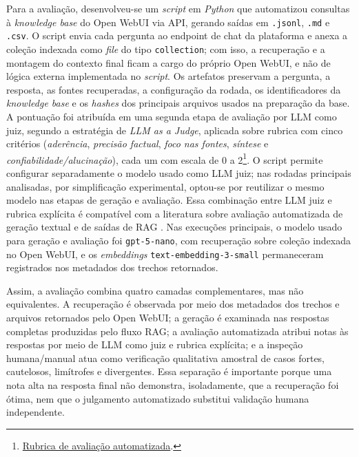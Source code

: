 Para a avaliação, desenvolveu-se um \textit{script} em \textit{Python} que automatizou consultas à \textit{knowledge base} do Open WebUI via API, gerando saídas em \texttt{.jsonl}, \texttt{.md} e \texttt{.csv}. O script envia cada pergunta ao endpoint de chat da plataforma e anexa a coleção indexada como \textit{file} do tipo \texttt{collection}; com isso, a recuperação e a montagem do contexto final ficam a cargo do próprio Open WebUI, e não de lógica externa implementada no \textit{script}. Os artefatos preservam a pergunta, a resposta, as fontes recuperadas, a configuração da rodada, os identificadores da \textit{knowledge base} e os \textit{hashes} dos principais arquivos usados na preparação da base. A pontuação foi atribuída em uma segunda etapa de avaliação por LLM como juiz, segundo a estratégia de \textit{LLM as a Judge}, aplicada sobre rubrica com cinco critérios (\textit{aderência}, \textit{precisão factual}, \textit{foco nas fontes}, \textit{síntese} e \textit{confiabilidade/alucinação}), cada um com escala de 0 a 2\footnote{\href{https://github.com/fabriciosantana/mcdia/blob/main/05-iag/4-project/eval/RUBRIC.md}{Rubrica de avaliação automatizada}.}. O script permite configurar separadamente o modelo usado como LLM juiz; nas rodadas principais analisadas, por simplificação experimental, optou-se por reutilizar o mesmo modelo nas etapas de geração e avaliação. Essa combinação entre LLM juiz e rubrica explícita é compatível com a literatura sobre avaliação automatizada de geração textual e de saídas de RAG \parencite{liuEtAl2025judgeRag,liuEtAl2023geval}. Nas execuções principais, o modelo usado para geração e avaliação foi \texttt{gpt-5-nano}, com recuperação sobre coleção indexada no Open WebUI, e os \textit{embeddings} \texttt{text-embedding-3-small} permaneceram registrados nos metadados dos trechos retornados.

Assim, a avaliação combina quatro camadas complementares, mas não equivalentes. A recuperação é observada por meio dos metadados dos trechos e arquivos retornados pelo Open WebUI; a geração é examinada nas respostas completas produzidas pelo fluxo RAG; a avaliação automatizada atribui notas às respostas por meio de LLM como juiz e rubrica explícita; e a inspeção humana/manual atua como verificação qualitativa amostral de casos fortes, cautelosos, limítrofes e divergentes. Essa separação é importante porque uma nota alta na resposta final não demonstra, isoladamente, que a recuperação foi ótima, nem que o julgamento automatizado substitui validação humana independente.

